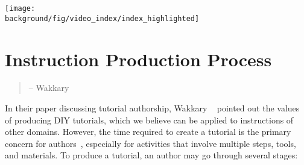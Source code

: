 \begin{figure*}[h!]
  \centering
  \texttt{[image: \\background/fig/video\_index/index\_highlighted]}
  \begin{minipage}{\textwidth}
  \caption[Video index to a video tutorial helps viewers navigate between topics.]{
    Video index to a video tutorial\footnote{Mountain Buggy, Urban Jungle ™ Stroller Instructions, \url{https://youtu.be/QwCtdpDmYu8}} helps viewers navigate between topics.
  }
  \label{fig:background_video_index}
  \end{minipage}
\end{figure*}


\section{Instruction Production Process}
\label{background_creation}

\begin{quote}
 -- Wakkary \ea{}~\cite{Wakkary:2015:TAH:2702123.2702550}
\end{quote}

In their paper discussing tutorial authorship, Wakkary \ea{}~\cite{Wakkary:2015:TAH:2702123.2702550} pointed out the values of producing DIY tutorials, which we believe can be applied to instructions of other domains. However, the time required to create a tutorial is the primary concern for authors~\cite{Kuznetsov:2010:REA:1868914.1868950,Tseng:2014:PVP:2598510.2598540}, especially for activities that involve multiple steps, tools, and materials. To produce a tutorial, an author may go through several stages:

